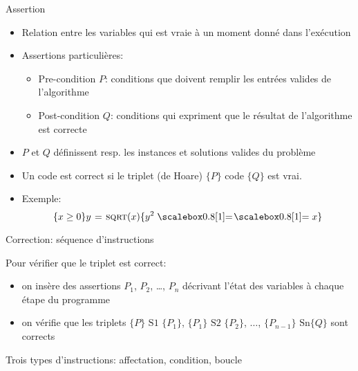 \begin{frame}{Assertion}

\begin{itemize}
\item Relation entre les variables qui est vraie à un moment donné dans l'exécution
\item Assertions particulières:
\begin{itemize}
\item Pre-condition $P$: conditions que doivent remplir les entrées valides de l'algorithme
\item Post-condition $Q$: conditions qui expriment que le résultat de l'algorithme est correcte
\end{itemize}
\item $P$ et $Q$ définissent resp. les instances et solutions valides du problème
\item Un code est correct si le triplet (de Hoare) $\{P\}$ code $\{Q\}$ est vrai.
\item Exemple:
$$\{x\geq 0\} y\gets \proc{sqrt}(x) \{y^2\isequal x\}$$
\end{itemize}

\end{frame}

\begin{frame}{Correction: séquence d'instructions}

\begin{center}\footnotesize
{}
\end{center}

Pour vérifier que le triplet est correct:
\begin{itemize}
\item on insère des assertions $P_1$, $P_2$, \ldots, $P_n$ décrivant
  l'état des variables à chaque étape du programme
\item on vérifie que les triplets $\{P\}\mbox{ S1 }\{P_1\}$,
  $\{P_1\}\mbox{ S2 }\{P_2\}$, $\ldots$, $\{P_{n-1}\} \mbox{ Sn
}\{Q\}$ sont corrects
\end{itemize}

\medskip

Trois types d'instructions: affectation, condition, boucle


\end{frame}

